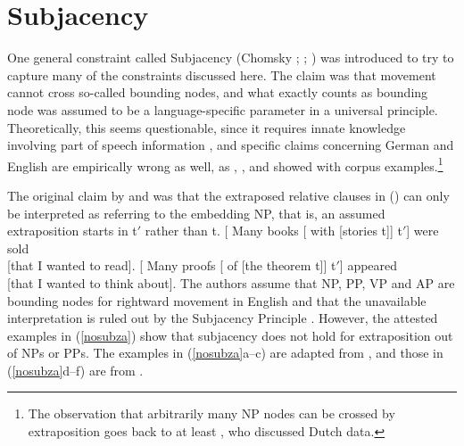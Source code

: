 \documentclass[output=paper
 	        ,biblatex
                ,babelshorthands
                ,newtxmath
                ,draftmode
                ,colorlinks, citecolor=brown
]{langscibook}
\begin{document}
\section{Subjacency}

One general constraint called Subjacency (Chomsky \citeyear[]{Chomsky73a}; \citeyear[]{Chomsky86b};
\citealp{Baltin81a,Baltin2006a}) was introduced to try to capture many of the constraints discussed here.
The claim was that movement cannot cross so-called bounding nodes, and what exactly counts as bounding
node was assumed to be a language-specific parameter in a universal principle. Theoretically, this
seems questionable, since it requires innate knowledge involving part of speech information
\parencites[Section~13.1.5.1]{MuellerGT-Eng4}[--540]{Newmeyer2004a}, and specific claims
concerning German and English are empirically wrong as well, as \citet{Mueller2004d},
\citet{Mueller2007c}, \citet{MM2009a} and \citet{SS2013b-u} showed with corpus examples.\footnote{
  The observation that arbitrarily many NP nodes can be crossed by extraposition goes back
  to at least \citet[]{Koster78b-u}, who discussed Dutch data.
}

The original claim by \citet{Baltin81a} and \citet[]{Chomsky86b} was that the extraposed
relative clauses in () can only be interpreted as referring to the embedding NP, that is, an
assumed extraposition starts in t$'$ rather than t.
\eal
\label{ex-chomsky-sub}
\ex {}[ Many books [ with [stories t]] t$'$]  were sold\\
    {}[that I wanted to read].
\ex {}[ Many proofs [ of [the theorem t]] t$'$] appeared\\
    {}[that I wanted to think about].
\zl
The authors assume that NP, PP, VP and AP are bounding nodes for rightward movement in English and
that the unavailable interpretation is ruled out by the Subjacency Principle \citep[]{Baltin81a}. However, the attested examples in (\ref{nosubza}) show that subjacency does not
hold for extraposition out of NPs or PPs. The examples in (\ref{nosubza}a--c) are adapted from
\citet[, 109, 111]{SS2013b-u}, and those in (\ref{nosubza}d--f) are from \citet[863]{chavesrnr}.
\eal \label{nosubza}

\end{document}
